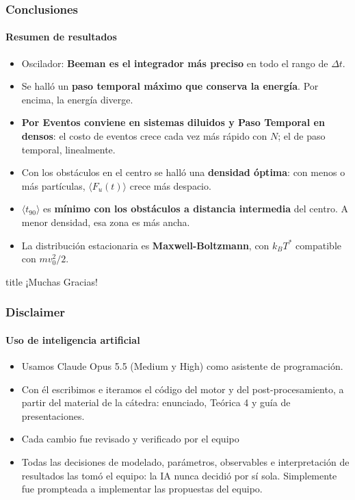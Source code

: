 \documentclass[11pt,aspectratio=169]{beamer}
\newcommand{\dt}{\Delta t}
\newcommand{\tnov}{\langle t_{90}\rangle}
\newcommand{\kT}{k_BT}
\newenvironment{cuerpo}[1][0.88\textwidth]{%
  \par\vspace{0.2em}\begin{center}\begin{minipage}{#1}}%
  {\end{minipage}\end{center}}
\newcommand{\cajatitulo}[1]{%
  \begin{center}%
  \begin{minipage}{0.84\textwidth}%
    \begin{beamercolorbox}[wd=\linewidth,sep=14pt,center]{title}
      \usebeamerfont{title}#1
    \end{beamercolorbox}%
  \end{minipage}%
  \end{center}}
\begin{document}
\begin{frame}
  \frametitle{Conclusiones}
  \framesubtitle{Resumen de resultados}

  \vfill
  \begin{cuerpo}[0.92\textwidth]
    \small
    \begin{itemize}\setlength{\itemsep}{0.45em}
      \item Oscilador: \textbf{Beeman es el integrador más preciso} en todo el rango de $\dt$.
      \item Se halló un \textbf{paso temporal máximo que conserva la energía}. Por encima, la energía diverge.
      \item \textbf{Por Eventos conviene en sistemas diluidos y Paso Temporal en densos}:
            el costo de eventos crece cada vez más rápido con $N$; el de paso temporal, linealmente.
      \item Con los obstáculos en el centro se halló una \textbf{densidad óptima}:
            con menos o más partículas, $\langle F_u(t)\rangle$ crece más despacio.
      \item $\tnov$ es \textbf{mínimo con los obstáculos a distancia intermedia} del centro.
            A menor densidad, esa zona es más ancha.
      \item La distribución estacionaria es \textbf{Maxwell-Boltzmann}, con $\kT^{*}$ compatible con $m v_0^2/2$.
    \end{itemize}
  \end{cuerpo}
  \vfill
\end{frame}

\begin{frame}
  \vfill
  \cajatitulo{¡Muchas Gracias!}
  \vfill
\end{frame}


\begin{frame}
  \frametitle{Disclaimer}
  \framesubtitle{Uso de inteligencia artificial}

  \vfill
  \begin{cuerpo}[0.84\textwidth]
    \begin{itemize}\setlength{\itemsep}{0.8em}
      \item Usamos Claude Opus 5.5 (Medium y High) como asistente de programación.
      \item Con él escribimos e iteramos el código del motor y del
            post-procesamiento, a partir del material de la cátedra:
            enunciado, Teórica 4 y guía de presentaciones.
      \item Cada cambio fue revisado y verificado por el equipo
      \item Todas las decisiones de modelado, parámetros, observables e
            interpretación de resultados las tomó el equipo: la IA nunca
            decidió por sí sola. Simplemente fue prompteada a implementar las propuestas del equipo.
    \end{itemize}
  \end{cuerpo}
  \vfill
\end{frame}
\end{document}
